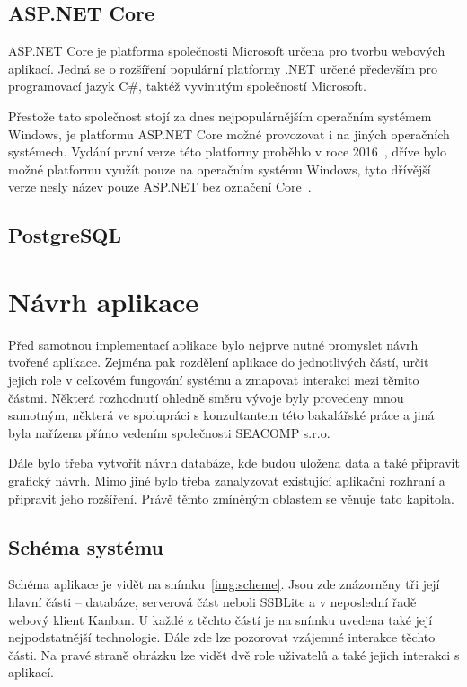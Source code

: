 \section{ASP.NET Core}
ASP.NET Core je platforma společnosti Microsoft určena pro tvorbu webových aplikací. Jedná se o rozšíření populární platformy .NET určené především pro programovací jazyk C\#, taktéž vyvinutým společností Microsoft.

Přestože tato společnost stojí za dnes nejpopulárnějším operačním systémem Windows, je platformu ASP.NET Core možné provozovat i na jiných operačních systémech. Vydání první verze této platformy proběhlo v roce 2016~\cite{bib:asp-release}, dříve bylo možné platformu využít pouze na operačním systému Windows, tyto dřívější verze nesly název pouze ASP.NET bez označení Core~\cite{bib:asp-what-is}.

\blindtext

\section{PostgreSQL}
\blindtext



\chapter{Návrh aplikace}
Před samotnou implementací aplikace bylo nejprve nutné promyslet návrh tvořené aplikace. Zejména pak rozdělení aplikace do jednotlivých částí, určit jejich role v celkovém fungování systému a zmapovat interakci mezi těmito částmi. Některá rozhodnutí ohledně směru vývoje byly provedeny mnou samotným, některá ve spolupráci s konzultantem této bakalářské práce a jiná byla nařízena přímo vedením společnosti SEACOMP s.r.o.

Dále bylo třeba vytvořit návrh databáze, kde budou uložena data a také připravit grafický návrh. Mimo jiné bylo třeba zanalyzovat existující aplikační rozhraní a připravit jeho rozšíření. 
Právě těmto zmíněným oblastem se věnuje tato kapitola.




\section{Schéma systému}
Schéma aplikace je vidět na snímku~\ref{img:scheme}. Jsou zde znázorněny tři její hlavní části -- databáze, serverová část neboli SSBLite a v neposlední řadě webový klient Kanban. U každé z těchto částí je na snímku uvedena také její nejpodstatnější technologie. Dále zde lze pozorovat vzájemné interakce těchto části. Na pravé straně obrázku lze vidět dvě role uživatelů a také jejich interakci s aplikací.

